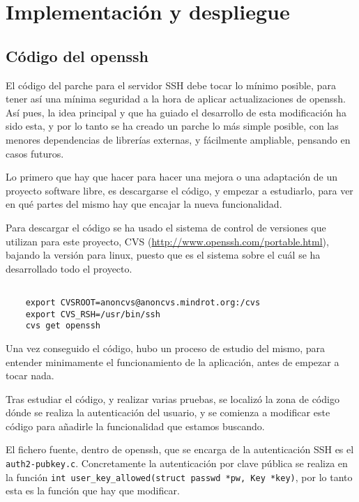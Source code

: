 
\chapter{Implementación y despliegue}
    \label{implementacion}
    \section{Código del openssh}

    El código del parche para el servidor SSH debe tocar lo mínimo posible,
    para tener así una mínima seguridad a la hora de aplicar
    actualizaciones de openssh. Así pues, la idea principal y que ha guiado
    el desarrollo de esta modificación ha sido esta, y por lo tanto se ha
    creado un parche lo más simple posible, con las menores dependencias de
    librerías externas, y fácilmente ampliable, pensando en casos futuros.

    Lo primero que hay que hacer para hacer una mejora o una adaptación de
    un proyecto software libre, es descargarse el código, y empezar a
    estudiarlo, para ver en qué partes del mismo hay que encajar la nueva
    funcionalidad.

    Para descargar el código se ha usado el sistema de control de versiones
    que utilizan para este proyecto, CVS
    (\url{http://www.openssh.com/portable.html}), bajando la versión para
    linux, puesto que es el sistema sobre el cuál se ha desarrollado todo
    el proyecto.
    
    \begin{verbatim}

    export CVSROOT=anoncvs@anoncvs.mindrot.org:/cvs
    export CVS_RSH=/usr/bin/ssh
    cvs get openssh

    \end{verbatim}

    Una vez conseguido el código, hubo un proceso de estudio del mismo,
    para entender minimamente el funcionamiento de la aplicación, antes de
    empezar a tocar nada.

    Tras estudiar el código, y realizar varias pruebas, se localizó la zona
    de código dónde se realiza la autenticación del usuario, y se comienza
    a modificar este código para añadirle la funcionalidad que estamos
    buscando.

    El fichero fuente, dentro de openssh, que se encarga de la
    autenticación SSH es el \texttt{auth2-pubkey.c}. Concretamente la
    autenticación por clave pública se realiza en la función
    \texttt{int user\_key\_allowed(struct passwd *pw, Key *key)}, por lo
    tanto esta es la función que hay que modificar.


